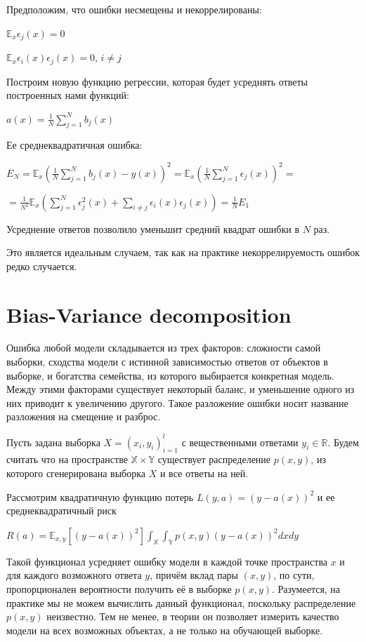 \documentclass{article}
\theoremstyle{definition}
\theoremstyle{theorem}
\theoremstyle{remark}
\theoremstyle{theorem}
\theoremstyle{example}
\theoremstyle{theorem}
\theoremstyle{theorem}
\theoremstyle{theorem}
\theoremstyle{theorem}
\begin{document}
Предположим, что ошибки несмещены и некоррелированы:

$\mathbb{E}_x\epsilon_j(x) = 0$

$ \mathbb{E}_x\epsilon_i(x)\epsilon_j(x) = 0$,  $i\neq j$

Построим  новую функцию регрессии, которая будет усреднять ответы построенных нами функций:

$a(x) = \frac{1}{N}\sum_{j=1}^{N}b_j(x)$

Ее среднеквадратичная ошибка:

$E_N = \mathbb{E}_x\left(\frac{1}{N}\sum_{j=1}^{N}b_j(x)-y(x)\right)^2 = \mathbb{E}_x\left(\frac{1}{N}\sum_{j=1}^{N}\epsilon_j(x)\right)^2 = $

$=\frac{1}{N^2}\mathbb{E}_x\left(\sum_{j=1}^{N}\epsilon^2_j(x) + \sum_{i\neq j}^{}\epsilon_i(x)\epsilon_j(x)\right)=\frac{1}{N}E_1$

Усреднение ответов позволило уменьшит средний квадрат ошибки в $N$ раз.

Это является идеальным случаем, так как на практике некоррелируемость ошибок редко случается.

\section{Bias-Variance decomposition}

Ошибка любой модели складывается из трех факторов: сложности самой выборки, сходства модели с истинной зависимостью ответов от объектов в выборке, и богатства семейства, из которого выбирается конкретная модель. Между этими факторами существует некоторый баланс, и уменьшение одного из них приводит к увеличению другого. Такое разложение ошибки носит название разложения на смещение и разброс.

Пусть задана выборка $X = (x_i,y_i)^l_{i=1}$ с вещественными ответами $y_i \in \mathbb{R}$. Будем считать что на пространстве $\mathbb{X} \times \mathbb{Y}$ существует распределение $p(x,y)$, из которого сгенерирована выборка $X$ и все ответы на ней.

Рассмотрим квадратичную функцию потерь $L(y,a) = (y-a(x))^2$ и ее среднеквадратичный риск

$R(a) = \mathbb{E}_{x,y}\left[(y-a(x))^2\right] \int_{\mathbb{X}}\int_{\mathbb{Y}} p(x,y)(y-a(x))^2dxdy$

Такой функционал усредняет ошибку модели в каждой точке пространства $x$ и для каждого возможного ответа $y$, причём вклад пары $(x, y)$, по сути, пропорционален вероятности получить её в выборке $p(x, y)$. Разумеется, на практике мы не можем вычислить данный функционал, поскольку распределение $p(x, y)$ неизвестно. Тем не менее, в теории он позволяет измерить качество модели на всех возможных объектах, а не только на обучающей выборке.
\end{document}
